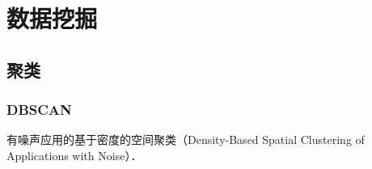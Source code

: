 \chapter{数据挖掘}

\section{聚类}

\subsection{DBSCAN}

有噪声应用的基于密度的空间聚类（Density-Based Spatial Clustering of Applications with Noise）．
